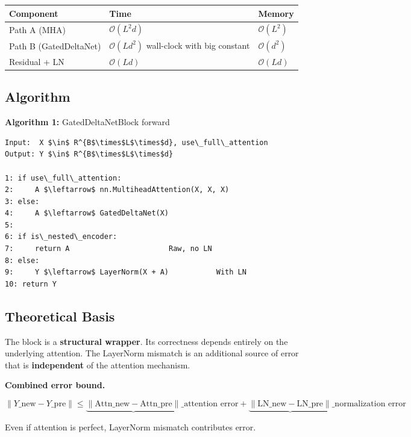 \begin{table}[H]
\centering
\small
\begin{tabular}{lll}
\toprule
\textbf{Component} & \textbf{Time} & \textbf{Memory} \\
\midrule
Path A (MHA) & $\mathcal{O}(L^2 d)$ & $\mathcal{O}(L^2)$ \\
Path B (GatedDeltaNet) & $\mathcal{O}(L d^2)$ wall-clock with big constant & $\mathcal{O}(d^2)$ \\
Residual + LN & $\mathcal{O}(Ld)$ & $\mathcal{O}(Ld)$ \\
\bottomrule
\end{tabular}
\end{table}

\subsection{Algorithm}

\textbf{Algorithm 1:} GatedDeltaNetBlock forward
\begin{lstlisting}
Input:  X $\in$ R^{B$\times$L$\times$d}, use\_full\_attention
Output: Y $\in$ R^{B$\times$L$\times$d}

1: if use\_full\_attention:
2:     A $\leftarrow$ nn.MultiheadAttention(X, X, X)
3: else:
4:     A $\leftarrow$ GatedDeltaNet(X)
5:
6: if is\_nested\_encoder:
7:     return A                       Raw, no LN
8: else:
9:     Y $\leftarrow$ LayerNorm(X + A)           With LN
10: return Y
\end{lstlisting}

\subsection{Theoretical Basis}

The block is a \textbf{structural wrapper}. Its correctness depends entirely on 
the underlying attention. The LayerNorm mismatch is an additional source 
of error that is \textbf{independent} of the attention mechanism.

\textbf{Combined error bound.}

\[
\|Y\_\text{new} - Y\_\text{pre}\| \leq \underbrace{\|\text{Attn}\_\text{new} - \text{Attn}\_\text{pre}\|}\_{\text{attention error}} + \underbrace{\|\text{LN}\_\text{new} - \text{LN}\_\text{pre}\|}\_{\text{normalization error}}
\tag{4.2}
\]

Even if attention is perfect, LayerNorm mismatch contributes error.

